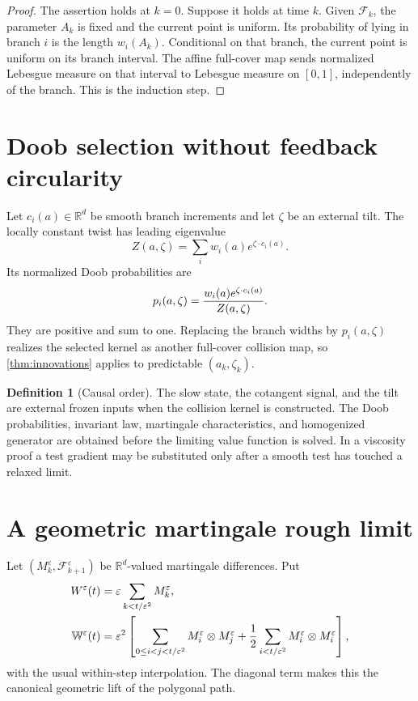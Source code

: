 \documentclass[11pt,reqno]{amsart}
\theoremstyle{definition}
\newtheorem{definition}[theorem]{Definition}
\theoremstyle{remark}
\newcommand{\R}{\mathbb R}
\newcommand{\F}{\mathcal F}
\begin{document}
\begin{proof}
The assertion holds at $k=0$.  Suppose it holds at time $k$.  Given $\F_k$,
the parameter $A_k$ is fixed and the current point is uniform.  Its probability
of lying in branch $i$ is the length $w_i(A_k)$.  Conditional on that branch,
the current point is uniform on its branch interval.  The affine full-cover map
sends normalized Lebesgue measure on that interval to Lebesgue measure on
$[0,1]$, independently of the branch.  This is the induction step.
\end{proof}

\section{Doob selection without feedback circularity}

Let $c_i(a)\in\R^d$ be smooth branch increments and let $\zeta$ be an external
tilt.  The locally constant twist has leading eigenvalue
\[
 Z(a,\zeta)=\sum_iw_i(a)e^{\zeta\cdot c_i(a)}.
\]
Its normalized Doob probabilities are
\begin{equation}\label{eq:doob}
 p_i(a,\zeta)=
 {w_i(a)e^{\zeta\cdot c_i(a)}\over Z(a,\zeta)}.
\end{equation}
They are positive and sum to one.  Replacing the branch widths by
$p_i(a,\zeta)$ realizes the selected kernel as another full-cover collision
map, so \cref{thm:innovations} applies to predictable $(a_k,\zeta_k)$.

\begin{definition}[Causal order]
The slow state, the cotangent signal, and the tilt are external frozen inputs
when the collision kernel is constructed.  The Doob probabilities, invariant
law, martingale characteristics, and homogenized generator are obtained before
the limiting value function is solved.  In a viscosity proof a test gradient
may be substituted only after a smooth test has touched a relaxed limit.
\end{definition}

\section{A geometric martingale rough limit}

Let $(M_k^\varepsilon,\F_{k+1}^\varepsilon)$ be $\R^d$-valued martingale
differences.  Put
\begin{align}
 W^\varepsilon(t)&=\varepsilon
 \sum_{k<t/\varepsilon^2}M_k^\varepsilon,\label{eq:W}\\
 \mathbb W^\varepsilon(t)&=\varepsilon^2
 \left[
 \sum_{0\le i<j<t/\varepsilon^2}M_i^\varepsilon\otimes M_j^\varepsilon
 +{1\over2}\sum_{i<t/\varepsilon^2}
 M_i^\varepsilon\otimes M_i^\varepsilon
 \right],\label{eq:WW}
\end{align}
with the usual within-step interpolation.  The diagonal term makes this the
canonical geometric lift of the polygonal path.
\end{document}
